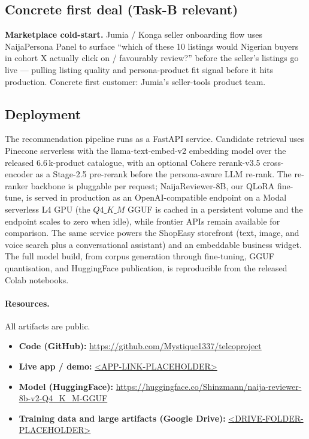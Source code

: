 \documentclass[sigconf,nonacm,balance]{acmart}
\begin{document}
\subsection*{Concrete first deal (Task-B relevant)}
\textbf{Marketplace cold-start.} Jumia / Konga seller onboarding flow
uses NaijaPersona Panel to surface ``which of these 10 listings would
Nigerian buyers in cohort X actually click on / favourably review?''
before the seller's listings go live --- pulling listing quality and
persona-product fit signal before it hits production. Concrete first
customer: Jumia's seller-tools product team.

\subsection{Deployment}
\label{sec:deploy}
The recommendation pipeline runs as a FastAPI service. Candidate retrieval
uses Pinecone serverless with the \textsf{llama-text-embed-v2} embedding model
over the released 6.6\,k-product catalogue, with an optional Cohere
\textsf{rerank-v3.5} cross-encoder as a Stage-2.5 pre-rerank before the
persona-aware LLM re-rank. The re-ranker backbone is pluggable per request;
NaijaReviewer-8B, our QLoRA fine-tune, is served in production as an
OpenAI-compatible endpoint on a Modal serverless L4 GPU (the $Q4\_K\_M$ GGUF
is cached in a persistent volume and the endpoint scales to zero when idle),
while frontier APIs remain available for comparison. The same service powers
the ShopEasy storefront (text, image, and voice search plus a conversational
assistant) and an embeddable business widget. The full model build, from
corpus generation through fine-tuning, GGUF quantisation, and HuggingFace
publication, is reproducible from the released Colab notebooks.

\paragraph{Resources.} All artifacts are public.
\begin{itemize}[leftmargin=*,nosep]
  \item \textbf{Code (GitHub):} \url{https://github.com/Mystique1337/telcoproject}
  \item \textbf{Live app / demo:} \url{<APP-LINK-PLACEHOLDER>} %
  \item \textbf{Model (HuggingFace):}
        \url{https://huggingface.co/Shinzmann/naija-reviewer-8b-v2-Q4_K_M-GGUF}
  \item \textbf{Training data and large artifacts (Google Drive):}
        \url{<DRIVE-FOLDER-PLACEHOLDER>} %
\end{itemize}
\end{document}
